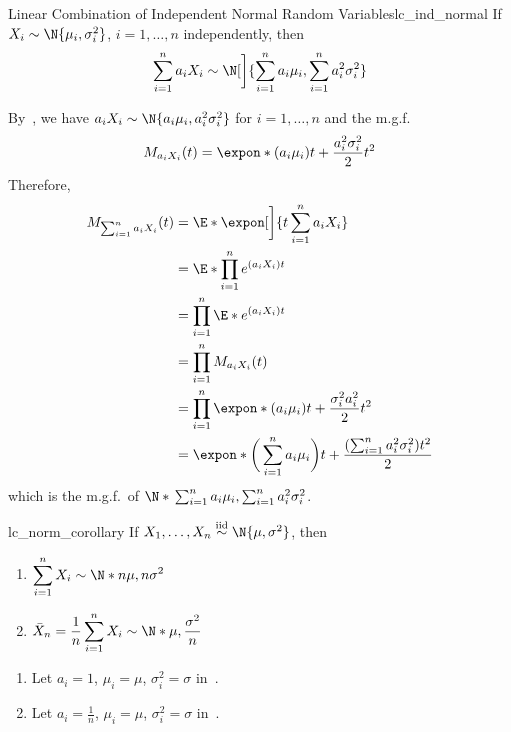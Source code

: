\begin{Theorem}{Linear Combination of Independent Normal Random Variables}{lc_ind_normal}
    If $ X_i \sim \N{\mu_i,\sigma_i^2} $, $ i=1,\ldots,n $
    independently, then
    \[ \sum_{i=1}^{n} a_i X_i \sim \N[\bigg]{\sum_{i=1}^{n} a_i\mu_i,
            \sum_{i=1}^{n} a_i^2\sigma_i^2} \]
\end{Theorem}
\begin{Proof}{}{}
    By~, we have
    $ a_i X_i \sim \N{a_i\mu_i,a_i^2\sigma_i^2} $ for $ i=1,\ldots, n $
    and the m.g.f.\
    \[ M_{a_i X_i}(t)=\expon*{(a_i\mu_i)t+\frac{a_i^2\sigma_i^2}{2}t^2} \]
    Therefore,
    \begin{align*}
        M_{\sum_{i=1}^{n} a_i X_i}(t)
         & =\E*{\expon[\bigg]{t \sum_{i=1}^{n} a_i X_i}}                      \\
         & =\E*{\prod_{i=1}^n e^{(a_i X_i)t}}                                 \\
         & =\prod_{i=1}^n\E*{e^{(a_i X_i)t}}                                  \\
         & =\prod_{i=1}^n M_{a_i X_i}(t)                                      \\
         & =\prod_{i=1}^n \expon*{(a_i\mu_i)t+\frac{\sigma_i^2 a_i^2}{2}t^2 } \\
         & =\expon*{\biggl(\,\sum_{i=1}^{n} a_i\mu_i\biggr)t
            +\frac{(\sum_{i=1}^{n} a_i^2\sigma_i^2)t^2}{2}}
    \end{align*}
    which is the m.g.f.\ of
    $ \N*{\,\sum_{i=1}^{n} a_i\mu_i,\sum_{i=1}^{n} a_i^2\sigma_i^2} $.
\end{Proof}
\begin{Corollary}{}{lc_norm_corollary}
    If $ X_1,\ldots,X_n \stackrel{\text{iid}}{\sim} \N{\mu,\sigma^2} $,
    then
    \begin{enumerate}[label=(\arabic*)]
        \item $ \displaystyle  \sum_{i=1}^{n} X_i \sim \N*{n\mu,n\sigma^2} $
        \item $ \displaystyle \bar{X}_n=\frac{1}{n} \sum_{i=1}^{n} X_i \sim \N*{\mu,\frac{\sigma^2}{n}} $
    \end{enumerate}
\end{Corollary}
\begin{Proof}{}{}
    \begin{enumerate}[label=(\arabic*)]
        \item Let $ a_i=1 $, $ \mu_i=\mu $, $ \sigma_i^2=\sigma $ in~.
        \item Let $ a_i=\frac{1}{n} $, $ \mu_i=\mu $, $ \sigma_i^2=\sigma $ in~.
    \end{enumerate}
\end{Proof}
